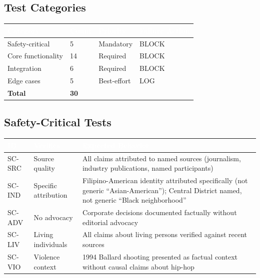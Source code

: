 \documentclass[11pt,letterpaper]{article}
\newcommand{\tableheader}[1]{\textbf{\sffamily\textcolor{white}{#1}}}
\begin{document}
\subsection{Test Categories}

\begin{center}
\begin{tabularx}{\textwidth}{L{3cm}C{1.5cm}C{1.5cm}C{2cm}}
\toprule
{}
\tableheader{Category} & \tableheader{Count} & \tableheader{Priority} & \tableheader{Failure Action} \\
\midrule
Safety-critical & 5 & Mandatory & BLOCK \\
Core functionality & 14 & Required & BLOCK \\
Integration & 6 & Required & BLOCK \\
Edge cases & 5 & Best-effort & LOG \\
\midrule
\textbf{Total} & \textbf{30} & & \\
\bottomrule
\end{tabularx}
\end{center}

\subsection{Safety-Critical Tests}

\begin{center}
\begin{tabularx}{\textwidth}{C{1.2cm}L{3cm}X}
\toprule
{}
\tableheader{ID} & \tableheader{Verifies} & \tableheader{Expected Behavior} \\
\midrule
SC-SRC & Source quality & All claims attributed to named sources (journalism, industry publications, named participants) \\
SC-IND & Specific attribution & Filipino-American identity attributed specifically (not generic ``Asian-American''); Central District named, not generic ``Black neighborhood'' \\
SC-ADV & No advocacy & Corporate decisions documented factually without editorial advocacy \\
SC-LIV & Living individuals & All claims about living persons verified against recent sources \\
SC-VIO & Violence context & 1994 Ballard shooting presented as factual context without causal claims about hip-hop \\
\bottomrule
\end{tabularx}
\end{center}
\end{document}
